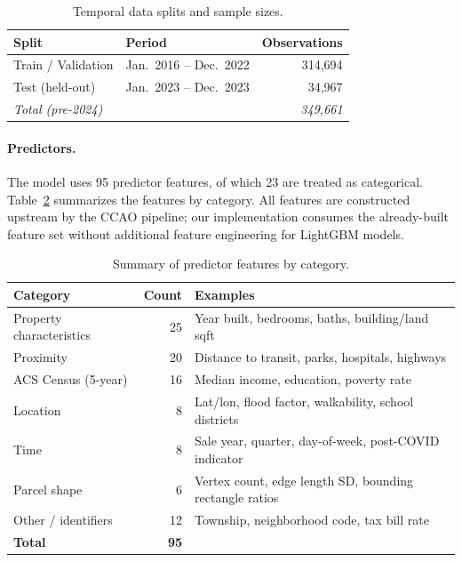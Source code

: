 \documentclass{article}
\theoremstyle{plain}
\theoremstyle{definition}
\newcommand{\1}{\mathbf{1}}
\begin{document}
\begin{table}[!ht]
\centering
\caption{Temporal data splits and sample sizes.}
\label{tab:data_splits}
\begin{tabular}{llr}
\toprule
\textbf{Split} & \textbf{Period} & \textbf{Observations} \\
\midrule
Train / Validation  & Jan.\ 2016 -- Dec.\ 2022 & 314{,}694 \\
Test (held-out)     & Jan.\ 2023 -- Dec.\ 2023 & 34{,}967 \\
\midrule
\textit{Total (pre-2024)} & & \textit{349{,}661} \\
\bottomrule
\end{tabular}
\end{table}

\paragraph{Predictors.} The model uses 95 predictor features, of which 23 are treated as categorical. Table~\ref{tab:feature_groups} summarizes the features by category. All features are constructed upstream by the CCAO pipeline; our implementation consumes the already-built feature set without additional feature engineering for LightGBM models.

\begin{table}[!ht]
\centering
\caption{Summary of predictor features by category.}
\label{tab:feature_groups}
\begin{tabular}{lrl}
\toprule
\textbf{Category} & \textbf{Count} & \textbf{Examples} \\
\midrule
Property characteristics & 25 & Year built, bedrooms, baths, building/land sqft \\
Proximity                & 20 & Distance to transit, parks, hospitals, highways \\
ACS Census (5-year)      & 16 & Median income, education, poverty rate \\
Location                 & 8  & Lat/lon, flood factor, walkability, school districts \\
Time                     & 8  & Sale year, quarter, day-of-week, post-COVID indicator \\
Parcel shape             & 6  & Vertex count, edge length SD, bounding rectangle ratios \\
Other / identifiers      & 12 & Township, neighborhood code, tax bill rate \\
\midrule
\textbf{Total}           & \textbf{95} & \\
\bottomrule
\end{tabular}
\end{table}
\end{document}

